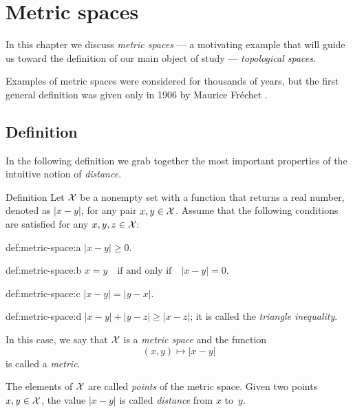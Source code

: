 \chapter{Metric spaces}

In this chapter we discuss \textit{metric spaces} --- 
a motivating example that will guide us toward the definition of our main object of study ---
\textit{topological spaces}.

Examples of metric spaces were considered for thousands of years,
but the first general definition was given only in 1906 by Maurice Fr\'echet \cite{frechet}.

\section{Definition}

In the following definition we grab together the most important properties of the intuitive notion of \textit{distance}.

\begin{thm}{Definition}\label{def:metric-space}
Let $\mathcal X$ be a nonempty set 
with a function 
that returns a real number, denoted as $|x-y|$,
for any pair $x,y\in\mathcal X$.
Assume that the following conditions are satisfied for any
$x,y,z\in \mathcal X$:

\begin{subthm}{def:metric-space:a}
$|x-y|\ge 0.$
\end{subthm}

\begin{subthm}{def:metric-space:b}
$x=y\quad\text{if and only if}\quad |x-y|=0.$
\end{subthm}

\begin{subthm}{def:metric-space:c}
$|x-y| = |y- x|.$
\end{subthm}

\begin{subthm}{def:metric-space:d}
$  |x- y| + |y- z| \ge |x-z|$; it is called the \emph{triangle inequality}.
\end{subthm}

In this case, we say that $\mathcal X$ is a \emph{metric space} 
and the function 
\[(x,y)\mapsto |x-y|\] 
is called a \emph{metric}. 

The elements of $\mathcal X$ are called \emph{points} of the metric space.
Given two points $x,y\z\in \c X$, 
the value $|x-y|$ is called \emph{distance} from $x$ to~$y$.
\end{thm}

